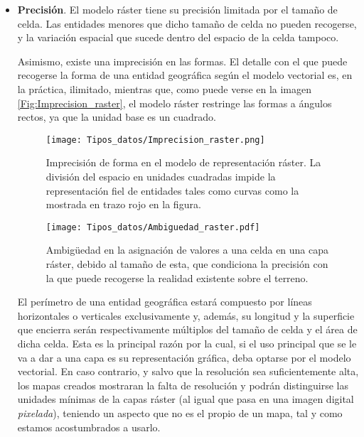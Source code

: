 \begin{multicols}{2}
\begin{itemize}
\item \textbf{Precisión}. El modelo ráster tiene su precisión limitada por el tamaño de celda. Las entidades menores que dicho tamaño de celda no pueden recogerse, y la variación espacial que sucede dentro del espacio de la celda tampoco. 

Asimismo, existe una imprecisión en las formas. El detalle con el que puede recogerse la forma de una entidad geográfica según el modelo vectorial es, en la práctica, ilimitado, mientras que, como puede verse en la imagen \ref{Fig:Imprecision_raster}, el modelo ráster restringe las formas a ángulos rectos, ya que la unidad base es un cuadrado. 


\begin{figure*}[ht]
\begin{minipage}{0.49\linewidth}
\centering
\texttt{[image: Tipos\_datos/Imprecision\_raster.png]}
\caption{\small Imprecisión de forma en el modelo de representación ráster. La división del espacio en unidades cuadradas impide la representación fiel de entidades tales como curvas como la mostrada en trazo rojo en la figura.}
\label{Fig:Imprecision_raster} 
\end{minipage}
\hfill
\begin{minipage}{0.49\linewidth}
\centering
\texttt{[image: Tipos\_datos/Ambiguedad\_raster.pdf]}
\vspace*{1cm}
\caption{\small Ambigüedad en la asignación de valores a una celda en una capa ráster, debido al tamaño de esta, que condiciona la precisión con la que puede recogerse la realidad existente sobre el terreno.}
\label{Fig:Ambiguedad_raster} 
\end{minipage}
\end{figure*}


El perímetro de una entidad geográfica estará compuesto por líneas horizontales o verticales exclusivamente y, además, su longitud y la superficie que encierra serán respectivamente múltiplos del tamaño de celda y el área de dicha celda. Esta es la principal razón por la cual, si el uso principal que se le va a dar a una capa es su representación gráfica, deba optarse por el modelo vectorial. En caso contrario, y salvo que la resolución sea suficientemente alta, los mapas creados mostraran la falta de resolución y podrán distinguirse las unidades mínimas de la capas ráster (al igual que pasa en una imagen digital \emph{pixelada}), teniendo un aspecto que no es el propio de un mapa, tal y como estamos acostumbrados a usarlo.


\end{itemize}
\end{multicols}
